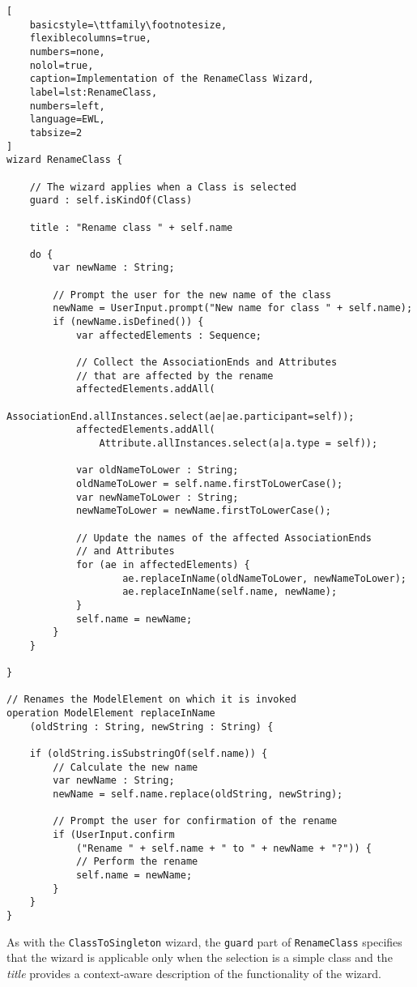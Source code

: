 \begin{lstlisting}[
	basicstyle=\ttfamily\footnotesize, 
	flexiblecolumns=true, 
	numbers=none, 
	nolol=true, 
	caption=Implementation of the RenameClass Wizard,
	label=lst:RenameClass, 
	numbers=left, 
	language=EWL, 
	tabsize=2
]
wizard RenameClass {
	
	// The wizard applies when a Class is selected
	guard : self.isKindOf(Class)
	
	title : "Rename class " + self.name
	
	do {
		var newName : String;
		
		// Prompt the user for the new name of the class
		newName = UserInput.prompt("New name for class " + self.name);
		if (newName.isDefined()) {
			var affectedElements : Sequence;
			
			// Collect the AssociationEnds and Attributes
			// that are affected by the rename
			affectedElements.addAll(
				AssociationEnd.allInstances.select(ae|ae.participant=self));
			affectedElements.addAll(
				Attribute.allInstances.select(a|a.type = self));
			
			var oldNameToLower : String;
			oldNameToLower = self.name.firstToLowerCase();
			var newNameToLower : String;
			newNameToLower = newName.firstToLowerCase();
			
			// Update the names of the affected AssociationEnds
			// and Attributes
			for (ae in affectedElements) {
					ae.replaceInName(oldNameToLower, newNameToLower);
					ae.replaceInName(self.name, newName);
			}
			self.name = newName;
		}
	}
	
}

// Renames the ModelElement on which it is invoked
operation ModelElement replaceInName
	(oldString : String, newString : String) {
	
	if (oldString.isSubstringOf(self.name)) {
		// Calculate the new name
		var newName : String;
		newName = self.name.replace(oldString, newString);
		
		// Prompt the user for confirmation of the rename
		if (UserInput.confirm
			("Rename " + self.name + " to " + newName + "?")) {
			// Perform the rename
			self.name = newName;
		}
	}
}
\end{lstlisting}
As with the \texttt{ClassToSingleton} wizard, the \texttt{guard} part of \texttt{RenameClass} specifies that the wizard is applicable only when the selection is a simple class and the \emph{title} provides a context-aware description of the functionality of the wizard. 


